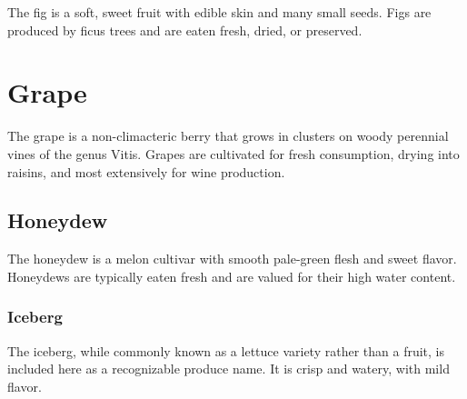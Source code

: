 \documentclass[12pt]{article}
\begin{document}
The fig is a soft, sweet fruit with edible skin and many small seeds. Figs
are produced by ficus trees and are eaten fresh, dried, or preserved.

\section{Grape}

The grape is a non-climacteric berry that grows in clusters on woody
perennial vines of the genus Vitis. Grapes are cultivated for fresh
consumption, drying into raisins, and most extensively for wine production.

\subsection{Honeydew}

The honeydew is a melon cultivar with smooth pale-green flesh and sweet
flavor. Honeydews are typically eaten fresh and are valued for their high
water content.

\subsubsection{Iceberg}

The iceberg, while commonly known as a lettuce variety rather than a fruit,
is included here as a recognizable produce name. It is crisp and watery,
with mild flavor.
\end{document}
